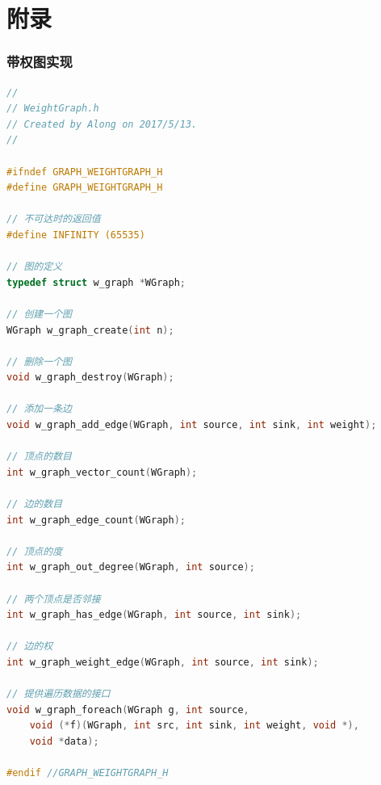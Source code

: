 \documentclass[a4paper,10pt]{ctexart}
\begin{document}
\newpage
\appendix
\part{附录}
\section{带权图实现}
\begin{lstlisting}[language={C}]
//
// WeightGraph.h
// Created by Along on 2017/5/13.
//

#ifndef GRAPH_WEIGHTGRAPH_H
#define GRAPH_WEIGHTGRAPH_H

// 不可达时的返回值
#define INFINITY (65535)

// 图的定义
typedef struct w_graph *WGraph;

// 创建一个图
WGraph w_graph_create(int n);

// 删除一个图
void w_graph_destroy(WGraph);

// 添加一条边
void w_graph_add_edge(WGraph, int source, int sink, int weight);

// 顶点的数目
int w_graph_vector_count(WGraph);

// 边的数目
int w_graph_edge_count(WGraph);

// 顶点的度
int w_graph_out_degree(WGraph, int source);

// 两个顶点是否邻接
int w_graph_has_edge(WGraph, int source, int sink);

// 边的权
int w_graph_weight_edge(WGraph, int source, int sink);

// 提供遍历数据的接口
void w_graph_foreach(WGraph g, int source,
    void (*f)(WGraph, int src, int sink, int weight, void *),
    void *data);

#endif //GRAPH_WEIGHTGRAPH_H
\end{lstlisting}
\end{document}
